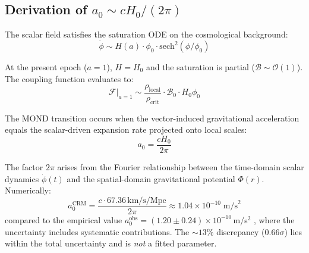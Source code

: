 \documentclass[aps,prd,twocolumn,superscriptaddress,nofootinbib]{revtex4-2}
\begin{document}
\subsection{Derivation of $a_0 \sim cH_0/(2\pi)$}
\label{sec:a0_derivation}

The scalar field satisfies the saturation ODE on the cosmological background:
\begin{equation}
\dot{\phi} \sim H(a) \cdot \phi_0 \cdot \mathrm{sech}^2(\phi/\phi_0)
\end{equation}

At the present epoch ($a = 1$), $H = H_0$ and the saturation is partial ($\mathcal{B} \sim \mathcal{O}(1)$). The coupling function evaluates to:
\begin{equation}
\mathcal{F}\big|_{a=1} \sim \frac{\rho_{\mathrm{local}}}{\rho_{\mathrm{crit}}} \cdot \mathcal{B}_0 \cdot H_0 \phi_0
\end{equation}

The MOND transition occurs when the vector-induced gravitational acceleration equals the scalar-driven expansion rate projected onto local scales:
\begin{equation}
a_0 = \frac{cH_0}{2\pi}
\label{eq:a0}
\end{equation}

The factor $2\pi$ arises from the Fourier relationship between the time-domain scalar dynamics $\dot{\phi}(t)$ and the spatial-domain gravitational potential $\Phi(r)$. Numerically:
\begin{equation}
a_0^{\mathrm{CRM}} = \frac{c \cdot 67.36\,\mathrm{km/s/Mpc}}{2\pi} \approx 1.04 \times 10^{-10}\;\mathrm{m/s}^2
\end{equation}
compared to the empirical value $a_0^{\mathrm{obs}} = (1.20 \pm 0.24) \times 10^{-10}$\,m/s$^2$ \cite{McGaugh2016}, where the uncertainty includes systematic contributions. The $\sim 13\%$ discrepancy ($0.66\sigma$) lies within the total uncertainty and is \textit{not} a fitted parameter.
\end{document}
